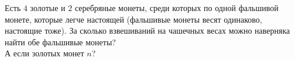 \begin{problems}
\item
\sbp
Есть $4$ золотые и $2$ серебряные монеты, среди которых по одной фальшивой
монете, которые легче настоящей
(фальшивые монеты весят одинаково, настоящие тоже).
За сколько взвешиваний  на чашечных весах можно наверняка найти обе фальшивые
монеты?
\\
\sbp
А если золотых монет $n$?

\end{problems}

